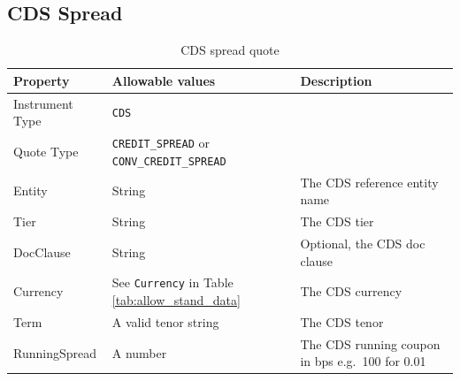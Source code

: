 \subsection{CDS Spread}
\label{md:cds_spread_quote}

\begin{table}[H]
\centering
  \begin{tabular}{|p{3cm}|p{3.5cm}|p{7cm}|}
    \hline
    {\bf Property} & {\bf Allowable values} & {\bf Description} \\ \hline
    Instrument Type & \lstinline!CDS! & \\ \hline
    Quote Type & \lstinline!CREDIT_SPREAD! or \lstinline!CONV_CREDIT_SPREAD! & \\ \hline
    Entity & String & The CDS reference entity name \\ \hline
    Tier & String & The CDS tier \\ \hline
    DocClause & String & Optional, the CDS doc clause \\ \hline
    Currency & See \lstinline!Currency! in Table \ref{tab:allow_stand_data} & The CDS currency\\ \hline
    Term & A valid tenor string & The CDS tenor\\ \hline
    RunningSpread & A number & The CDS running coupon in bps e.g.\ 100 for 0.01\\ \hline
  \end{tabular}
  \caption{CDS spread quote}
  \label{tab:cdsspread_quote}
\end{table}

